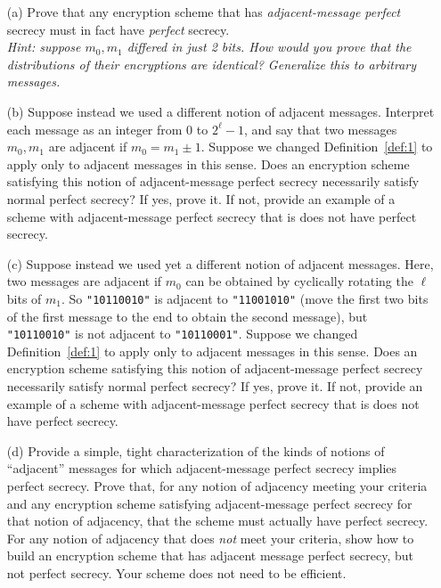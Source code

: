 \begin{itemize}
	\item[(a)] Prove that any encryption scheme that has \emph{adjacent-message perfect} secrecy must in fact have \emph{perfect} secrecy.  \\
	{\it Hint: suppose $m_0,m_1$ differed in just 2 bits.  How would you prove that the distributions of their encryptions are identical?  Generalize this to arbitrary messages.}
	\item[(b)] Suppose instead we used a different notion of adjacent messages.  Interpret each message as an integer from $0$ to $2^\ell-1$, and say that two messages $m_0,m_1$ are adjacent if $m_0=m_1\pm 1$.  Suppose we changed Definition~\ref{def:1} to apply only to adjacent messages in this sense.  Does an encryption scheme satisfying this notion of adjacent-message perfect secrecy necessarily satisfy normal perfect secrecy?  If yes, prove it.  If not, provide an example of a scheme with adjacent-message perfect secrecy that is does not have perfect secrecy.
	\item[(c)] Suppose instead we used yet a different notion of adjacent messages.  Here, two messages are adjacent if $m_0$ can be obtained by cyclically rotating the $\ell$ bits of $m_1$.  So \texttt{"10110010"} is adjacent to \texttt{"11001010"} (move the first two bits of the first message to the end to obtain the second message), but \texttt{"10110010"} is not adjacent to \texttt{"10110001"}.   Suppose we changed Definition~\ref{def:1} to apply only to adjacent messages in this sense.  Does an encryption scheme satisfying this notion of adjacent-message perfect secrecy necessarily satisfy normal perfect secrecy?  If yes, prove it.  If not, provide an example of a scheme with adjacent-message perfect secrecy that is does not have perfect secrecy.
	\item[(d)] Provide a simple, tight characterization of the kinds of notions of ``adjacent'' messages for which adjacent-message perfect secrecy implies perfect secrecy.  Prove that, for any notion of adjacency meeting your criteria and any encryption scheme satisfying adjacent-message perfect secrecy for that notion of adjacency, that the scheme must actually have perfect secrecy.  For any notion of adjacency that does \emph{not} meet your criteria, show how to build an encryption scheme that has adjacent message perfect secrecy, but not perfect secrecy.  Your scheme does not need to be efficient.
\end{itemize}




